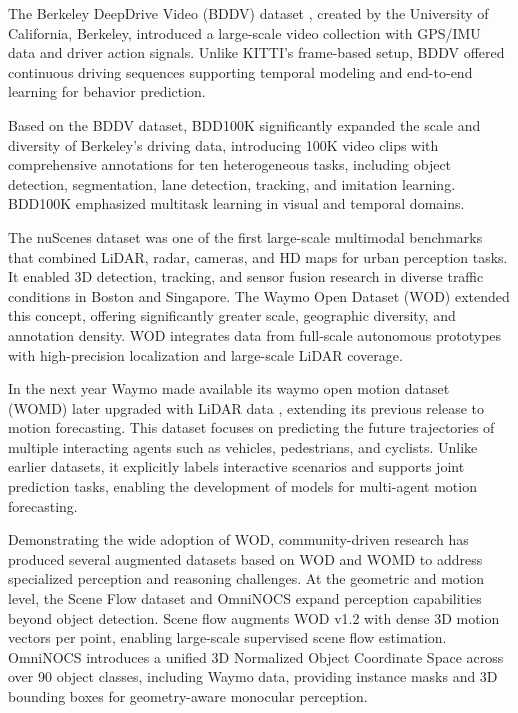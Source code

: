 The Berkeley DeepDrive Video (BDDV) dataset \cite{Xu_2017_CVPR}, created by the University of California, Berkeley, introduced a large-scale video collection with GPS/IMU data and driver action signals. Unlike KITTI’s frame-based setup, BDDV offered continuous driving sequences supporting temporal modeling and end-to-end learning for behavior prediction. 

Based on the BDDV dataset, BDD100K \cite{Yu_2020_CVPR} significantly expanded the scale and diversity of Berkeley’s driving data, introducing 100K video clips with comprehensive annotations for ten heterogeneous tasks, including object detection, segmentation, lane detection, tracking, and imitation learning. BDD100K emphasized multitask learning in visual and temporal domains.

The nuScenes dataset \cite{Caesar_2020_CVPR} was one of the first large-scale multimodal benchmarks that combined LiDAR, radar, cameras, and HD maps for urban perception tasks. It enabled 3D detection, tracking, and sensor fusion research in diverse traffic conditions in Boston and Singapore. The Waymo Open Dataset (WOD) \cite{sun2020} extended this concept, offering significantly greater scale, geographic diversity, and annotation density. WOD integrates data from full-scale autonomous prototypes with high-precision localization and large-scale LiDAR coverage. 


In the next year Waymo made available its waymo open motion dataset (WOMD) \cite{ettinger2021} later upgraded with LiDAR data \cite{chen2024} , extending its previous release to motion forecasting. This dataset focuses on predicting the future trajectories of multiple interacting agents such as vehicles, pedestrians, and cyclists. %
Unlike earlier datasets, it explicitly labels interactive scenarios and supports joint prediction tasks, enabling the development of models for multi-agent motion forecasting.

Demonstrating the wide adoption of WOD, community-driven research has produced several augmented datasets based on WOD and WOMD to address specialized perception and reasoning challenges. At the geometric and motion level, the Scene Flow dataset \cite{jund2021scalable} and OmniNOCS \cite{10.1007/978-3-031-73226-3_8} expand perception capabilities beyond object detection. Scene flow augments WOD v1.2 with dense 3D motion vectors per point, enabling large-scale supervised scene flow estimation. OmniNOCS introduces a unified 3D Normalized Object Coordinate Space across over 90 object classes, including Waymo data, providing instance masks and 3D bounding boxes for geometry-aware monocular perception.

